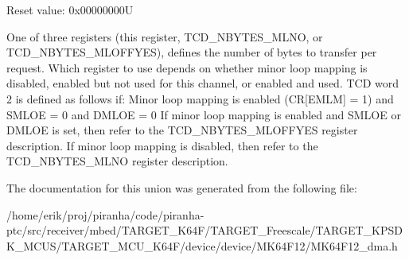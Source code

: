 Reset value\+: 0x00000000U

One of three registers (this register, T\+C\+D\+\_\+\+N\+B\+Y\+T\+E\+S\+\_\+\+M\+L\+NO, or T\+C\+D\+\_\+\+N\+B\+Y\+T\+E\+S\+\_\+\+M\+L\+O\+F\+F\+Y\+ES), defines the number of bytes to transfer per request. Which register to use depends on whether minor loop mapping is disabled, enabled but not used for this channel, or enabled and used. T\+CD word 2 is defined as follows if\+: Minor loop mapping is enabled (CR\mbox{[}E\+M\+LM\mbox{]} = 1) and S\+M\+L\+OE = 0 and D\+M\+L\+OE = 0 If minor loop mapping is enabled and S\+M\+L\+OE or D\+M\+L\+OE is set, then refer to the T\+C\+D\+\_\+\+N\+B\+Y\+T\+E\+S\+\_\+\+M\+L\+O\+F\+F\+Y\+ES register description. If minor loop mapping is disabled, then refer to the T\+C\+D\+\_\+\+N\+B\+Y\+T\+E\+S\+\_\+\+M\+L\+NO register description. 

The documentation for this union was generated from the following file\+:\begin{DoxyCompactItemize}
\item 
/home/erik/proj/piranha/code/piranha-\/ptc/src/receiver/mbed/\+T\+A\+R\+G\+E\+T\+\_\+\+K64\+F/\+T\+A\+R\+G\+E\+T\+\_\+\+Freescale/\+T\+A\+R\+G\+E\+T\+\_\+\+K\+P\+S\+D\+K\+\_\+\+M\+C\+U\+S/\+T\+A\+R\+G\+E\+T\+\_\+\+M\+C\+U\+\_\+\+K64\+F/device/device/\+M\+K64\+F12/M\+K64\+F12\+\_\+dma.\+h\end{DoxyCompactItemize}
